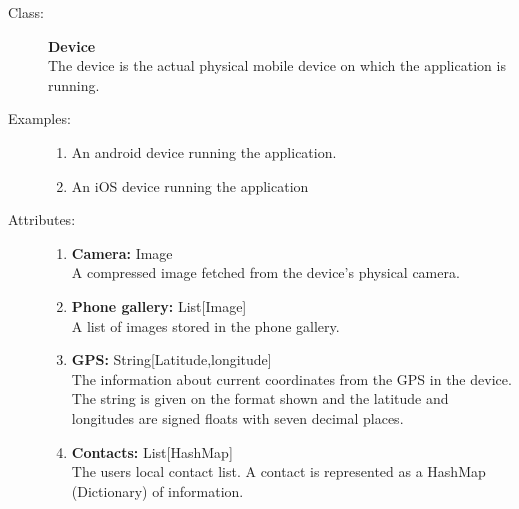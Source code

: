 \documentclass[10pt,a4paper]{article}
\begin{document}
\begin{description}
\item[Class:] \textbf{Device} \hfill \\
The device is the actual physical mobile device on which the application is running.

\item[Examples:] \hfill
\begin{enumerate}
\item An android device running the application.
\item An iOS device running the application
\end{enumerate}

\item[Attributes:] \hfill
\begin{enumerate}
\item \textbf{Camera:} Image \hfill \\A compressed image fetched from the device's physical camera.
\item \textbf{Phone gallery:} List[Image] \hfill \\A list of images stored in the phone gallery.
\item \textbf{GPS:} String[Latitude,longitude] \hfill \\The information about current coordinates from the GPS in the device. The string is given on the format shown and the latitude and longitudes are signed floats with seven decimal places.
\item \textbf{Contacts:} List[HashMap] \hfill \\The users local contact list. A contact is represented as a HashMap (Dictionary) of information.
\end{enumerate}
\end{description}

\hrulefill
\end{document}
